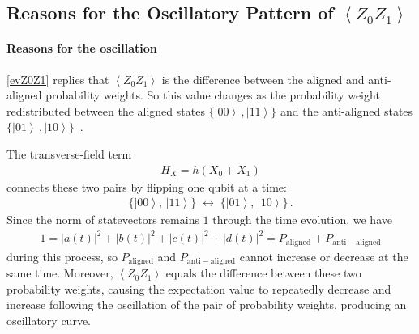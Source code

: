 \documentclass[11pt]{article}
\numberwithin{equation}{section}
\newcommand{\nm}[1]{\left| #1 \right|^2} %
\newcommand{\ket}[1]{\left| #1 \right\rangle} %
\newcommand{\ev}[1]{\left\langle #1 \right\rangle} %
\begin{document}
\subsection{Reasons for the Oscillatory Pattern of \texorpdfstring{$\ev{Z_0Z_1}$}{<Z0Z1>}}
\paragraph{Reasons for the oscillation}
\eqref{evZ0Z1} replies that $\ev{Z_0Z_1}$ is the difference between the aligned and anti-aligned probability weights. So this value changes as the  probability weight redistributed between the aligned states $\{\ket{00} \,, \ket{11}\}$ and the anti-aligned states $\{\ket{01} \,, \ket{10}\}$ \,.

The transverse-field term
\begin{align*}
    H_X = h(X_0+X_1)
\end{align*}
connects these two pairs by flipping one qubit at a time:
\begin{align*}
    \{\ket{00} ,\, \ket{11}\} \; \longleftrightarrow \; \{\ket{01} ,\, \ket{10}\} \,.
\end{align*}
Since the norm of statevectors remains $1$ through the time evolution, we have
\begin{align*}
    1 = \nm{a(t)} + \nm{b(t)} + \nm{c(t)} + \nm{d(t)} = P_{\mathrm{aligned}} + P_{\mathrm{anti-aligned}}
\end{align*}
during this process, so $P_{\mathrm{aligned}}$ and $ P_{\mathrm{anti-aligned}}$ cannot increase or decrease at the same time. 
Moreover, $\ev{Z_0Z_1}$ equals the difference between these two probability weights, causing the expectation value to repeatedly decrease and increase following the oscillation of the pair of probability weights, producing an oscillatory curve.
\end{document}
